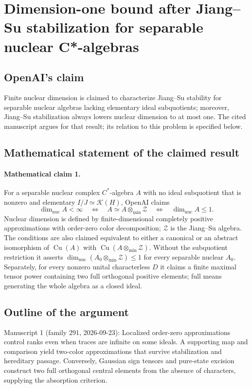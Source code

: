 \documentclass[11pt]{article}
\begin{document}
\section*{Dimension-one bound after Jiang–Su stabilization for separable nuclear C*-algebras}

\subsection{OpenAI's claim}
Finite nuclear dimension is claimed to characterize Jiang--Su stability for separable nuclear algebras lacking elementary ideal subquotients; moreover, Jiang--Su stabilization always lowers nuclear dimension to at most one. The cited manuscript argues for that result; its relation to this problem is specified below.

\subsection{Mathematical statement of the claimed result}
\paragraph{Mathematical claim 1.} For a separable nuclear complex $C^*$-algebra $A$ with no ideal subquotient that is nonzero and elementary $I/J\simeq\mathcal K(H)$, OpenAI claims
\[
\dim_{\mathrm{nuc}}A<\infty\quad\Longleftrightarrow\quad
A\simeq A\otimes_{\min}\mathcal Z\quad\Longleftrightarrow\quad\dim_{\mathrm{nuc}}A\le1.
\]
Nuclear dimension is defined by finite-dimensional completely positive approximations with order-zero color decomposition; $\mathcal Z$ is the Jiang--Su algebra. The conditions are also claimed equivalent to either a canonical or an abstract isomorphism of $\operatorname{Cu}(A)$ with $\operatorname{Cu}(A\otimes_{\min}\mathcal Z)$. Without the subquotient restriction it asserts $\dim_{\mathrm{nuc}}(A_0\otimes_{\min}\mathcal Z)\le1$ for every separable nuclear $A_0$. Separately, for every nonzero unital characterless $D$ it claims a finite maximal tensor power containing two full orthogonal positive elements; full means generating the whole algebra as a closed ideal.

\subsection{Outline of the argument}
Manuscript 1 (family 291, 2026-09-23): Localized order-zero approximations control ranks even when traces are infinite on some ideals. A supporting map and comparison yield two-color approximations that survive stabilization and hereditary passage. Conversely, Gaussian sign tensors and pure-state excision construct two full orthogonal central elements from the absence of characters, supplying the absorption criterion.
\end{document}
